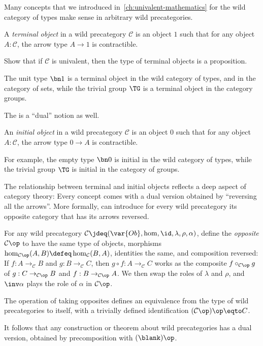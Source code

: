 Many concepts that we introduced in~\cref{ch:univalent-mathematics}
for the wild category of types make sense in arbitrary wild precategories.

\begin{definition}
  A \emph{terminal object}
  in a wild precategory $\mathcal C$ is an object $1$
  such that for any object $A:\mathcal C$,
  the arrow type $A \to 1$ is contractible.
\end{definition}
\begin{xca}
  Show that if $\mathcal C$ is univalent, then
  the type of terminal objects is a proposition.
\end{xca}
The unit type $\bn 1$ is a terminal object in the wild category of types,
and in the category of sets,
while the trivial group $\TG$ is a terminal object in the category groups.

The is a ``dual'' notion as well.
\begin{definition}
  An \emph{initial object}
  in a wild precategory $\mathcal C$ is an object $0$
  such that for any object $A:\mathcal C$,
  the arrow type $0\to A$ is contractible.
\end{definition}
For example, the empty type $\bn 0$ is initial in the wild category of types,
while the trivial group $\TG$ is initial in the category of groups.

The relationship between terminal and initial objects reflects
a deep aspect of category theory: Every concept comes with a dual version
obtained by ``reversing all the arrows''.
More formally, can introduce for every wild precategory its opposite category
that has its arrows reversed.
\begin{definition}
  For any wild precategory $\mathcal C\jdeq(\var{Ob},\hom,\id,\lambda,\rho,\alpha)$,
  define the \emph{opposite} $\mathcal C\op$
  to have the same type of objects,
  morphisms $\hom_{\mathcal C\op}(A,B) \defeq \hom_{\mathcal C}(B,A)$,
  identities the same, and composition reversed:
  If $f : A \to_{\mathcal C} B$ and $g : B \to_{\mathcal C} C$,
  then $g\circ f : A \to_{\mathcal C} C$ works
  as the composite $f \circ_{\mathcal C\op} g$ of $g : C \to_{\mathcal C\op} B$
  and $f : B \to_{\mathcal C\op} A$.
  We then swap the roles of $\lambda$ and $\rho$,
  and $\inv\alpha$ plays the role of $\alpha$ in $\mathcal C\op$.
\end{definition}
\begin{lemma}
  The operation of taking opposites defines an equivalence
  from the type of wild precategories to itself,
  with a trivially defined identification $(\mathcal C\op)\op \eqto C$.
\end{lemma}
It follows that any construction or theorem about wild precategories
has a dual version, obtained by precomposition with $(\blank)\op$.

